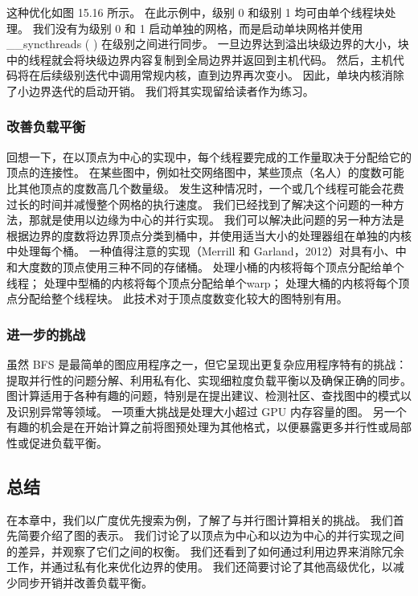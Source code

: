 这种优化如图 15.16 所示。 在此示例中，级别 0 和级别 1 均可由单个线程块处理。 
我们没有为级别 0 和 1 启动单独的网格，而是启动单块网格并使用 \_\_syncthreads ( ) 在级别之间进行同步。 
一旦边界达到溢出块级边界的大小，块中的线程就会将块级边界内容复制到全局边界并返回到主机代码。 
然后，主机代码将在后续级别迭代中调用常规内核，直到边界再次变小。 
因此，单块内核消除了小边界迭代的启动开销。 我们将其实现留给读者作为练习。

\subsubsection{改善负载平衡}
回想一下，在以顶点为中心的实现中，每个线程要完成的工作量取决于分配给它的顶点的连接性。 
在某些图中，例如社交网络图中，某些顶点（名人）的度数可能比其他顶点的度数高几个数量级。 
发生这种情况时，一个或几个线程可能会花费过长的时间并减慢整个网格的执行速度。 
我们已经找到了解决这个问题的一种方法，那就是使用以边缘为中心的并行实现。 
我们可以解决此问题的另一种方法是根据边界的度数将边界顶点分类到桶中，并使用适当大小的处理器组在单独的内核中处理每个桶。 
一种值得注意的实现（Merrill 和 Garland，2012）对具有小、中和大度数的顶点使用三种不同的存储桶。 
处理小桶的内核将每个顶点分配给单个线程； 处理中型桶的内核将每个顶点分配给单个warp； 
处理大桶的内核将每个顶点分配给整个线程块。 此技术对于顶点度数变化较大的图特别有用。

\subsubsection{进一步的挑战}
虽然 BFS 是最简单的图应用程序之一，但它呈现出更复杂应用程序特有的挑战：
提取并行性的问题分解、利用私有化、实现细粒度负载平衡以及确保正确的同步。 
图计算适用于各种有趣的问题，特别是在提出建议、检测社区、查找图中的模式以及识别异常等领域。 
一项重大挑战是处理大小超过 GPU 内存容量的图。 
另一个有趣的机会是在开始计算之前将图预处理为其他格式，以便暴露更多并行性或局部性或促进负载平衡。

\subsection{总结}
在本章中，我们以广度优先搜索为例，了解了与并行图计算相关的挑战。 我们首先简要介绍了图的表示。 
我们讨论了以顶点为中心和以边为中心的并行实现之间的差异，并观察了它们之间的权衡。 
我们还看到了如何通过利用边界来消除冗余工作，并通过私有化来优化边界的使用。 
我们还简要讨论了其他高级优化，以减少同步开销并改善负载平衡。